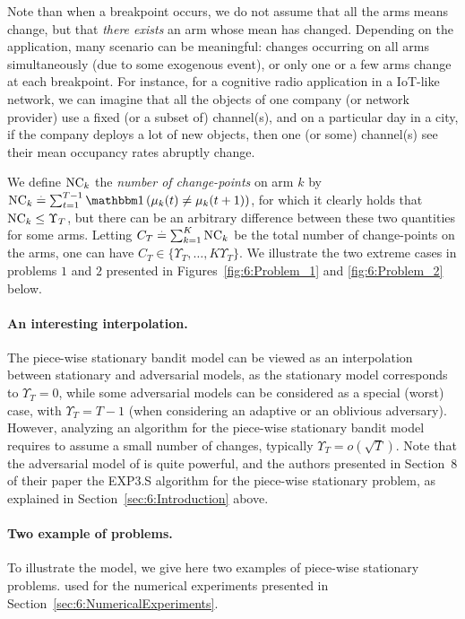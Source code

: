 Note than when a breakpoint occurs, we do not assume that all the arms means  change, but that \emph{there exists} an arm whose mean has changed.
Depending on the application, many scenario can be meaningful: changes occurring on all arms simultaneously (due to some exogenous event), or only one or a few arms change at each breakpoint.
For instance, for a cognitive radio application in a IoT-like network, we can imagine that all the objects of one company (or network provider) use a fixed (or a subset of) channel(s), and on a particular day in a city, if the company deploys a lot of new objects, then one (or some) channel(s) see their mean occupancy rates abruptly change.

We define $\text{NC}_k$ the \emph{number of change-points} on arm $k$ by
$\NCk \eqdef \sum_{t=1}^{T-1} \indic\left(\mu_k(t) \neq \mu_k(t+1)\right)$,
for which it clearly holds that
$\text{NC}_k \leq \Upsilon_T$, but there can be an arbitrary difference between these two quantities for some arms. Letting $C_T \overset{.}{=} \sum_{k=1}^K \text{NC}_k$ be the total number of change-points on the arms, one can have $C_T \in \{ \Upsilon_T, \dots, K\Upsilon_T \}$.
We illustrate the two extreme cases in problems $1$ and $2$ presented in Figures~\ref{fig:6:Problem_1} and \ref{fig:6:Problem_2} below.


\paragraph{An interesting interpolation.}
%
The piece-wise stationary bandit model can be viewed as an interpolation between stationary and adversarial models, as the stationary model corresponds to $\Upsilon_T = 0$, while some adversarial models can be considered as a special (worst) case, with $\Upsilon_T = T-1$ (when considering an adaptive or an oblivious adversary).
However, analyzing an algorithm for the piece-wise stationary bandit model requires to assume a small number of changes, typically $\Upsilon_T = o(\sqrt{T})$.
Note that the adversarial model of \cite{Auer02NonStochastic} is quite powerful, and the authors presented in Section~8 of their paper the EXP3.S algorithm for the piece-wise stationary problem, as explained in Section~\ref{sec:6:Introduction} above.


\paragraph{Two example of problems.}\label{par:6:benchmark1}
%
To illustrate the model, we give here two examples of piece-wise stationary problems.
used for the numerical experiments presented in Section~\ref{sec:6:NumericalExperiments}.

